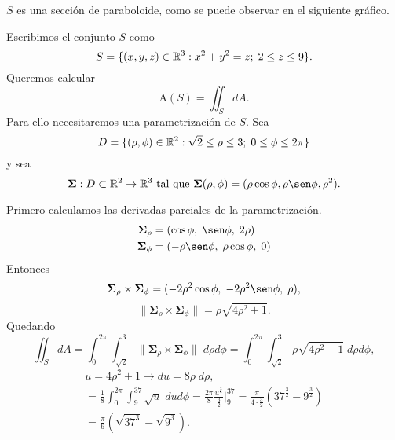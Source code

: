 \begin{solution}
  $S$ es una secci\'on de paraboloide, como se puede observar en el siguiente gr\'afico.

  \begin{center}
  \end{center}

  Escribimos el conjunto $S$ como
  \[
    S=\{(x,y,z)\in \mathbb{R}^3: x^2+y^2=z;\;2\leq z\leq 9 \}.
  \]
  Queremos calcular \[ \mbox{A}(S) = \iint_S dA.\]
  Para ello necesitaremos una parametrizaci\'on de $S$. Sea
  $$D=\{(\rho, \phi) \in\mathbb{R}^2:    \sqrt{2}\leq \rho \leq 3;\;0\leq  \phi \leq 2\pi \}$$  y  sea  $$\boldsymbol{\Sigma}:D \subset\Rn{2}\to\Rn{3}  \mbox{ tal que }   \boldsymbol{\Sigma}(\rho, \phi)=(\rho \cos\phi, \rho \sen\phi , \rho^{2}).$$

  Primero calculamos las derivadas parciales de la parametrizaci\'on.
  \begin{align*}
    \boldsymbol{\Sigma}_{\rho} & =(\cos \phi,\;\sen \phi,\; 2\rho)         \\
    \boldsymbol{\Sigma}_\phi   & =(  -\rho \sen \phi,\;\rho \cos \phi,\;0)
  \end{align*}
  Entonces
  $$
    \boldsymbol{\Sigma}_{\rho} \times\boldsymbol{\Sigma}_\phi =
    (-2\rho^2 \cos\phi  , \;-2\rho^2 \sen \phi, \;\rho),
  $$
  $$\|  \boldsymbol{\Sigma}_{\rho} \times\boldsymbol{\Sigma}_\phi\|
    = \rho\sqrt{4\rho^2+1}.$$
  Quedando
  \begin{equation}
    \iint_S dA
    = \int_0^{2\pi} \int_{\sqrt{2}}^3 \|\boldsymbol{\Sigma}_{\rho}
    \times\boldsymbol{\Sigma}_\phi \| \; d\rho d\phi
    = \int_0^{2\pi} \int_{\sqrt{2}}^3 \rho\sqrt{4\rho^2+1}\;d\rho d\phi,
    \label{eq:integral1}
  \end{equation}
  \begin{gather*}
  u=4\rho^2+1 \rightarrow du = 8\rho\;d\rho, 
  \\[.2cm]
  = \frac{1}{8}\int_0^{2\pi} \int_9^{37} \sqrt{u}\;du d\phi
  = \frac{2\pi}{8}\frac{u^{\frac{3}{2}}}{\frac{3}{2}}\Bigg|_9^{37}
  = \frac{\pi}{4\cdot\frac{3}{2}} (37^{\frac{3}{2}} - 9^{\frac{3}{2}}) 
  \\[.2cm]
  = \frac{\pi}{6} (\sqrt{37^3} - \sqrt{9^3}).
  \end{gather*}
\end{solution}

